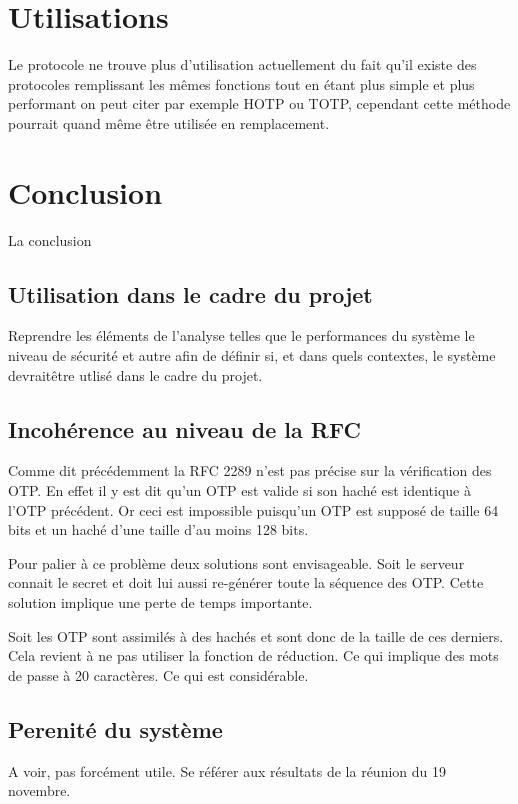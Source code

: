 \documentclass{../res/univ-projet}
\begin{document}
\section{Utilisations}
  Le protocole ne trouve plus d'utilisation actuellement du fait qu'il existe des protocoles remplissant
  les mêmes fonctions tout en étant plus simple et plus performant on peut citer par exemple HOTP ou TOTP, cependant
  cette méthode pourrait quand même être utilisée en remplacement.
  
\section{Conclusion}
  La conclusion
  \subsection{Utilisation dans le cadre du projet}
    Reprendre les éléments de l'analyse telles que le performances du système 
le 
niveau de sécurité et autre afin de définir si, et dans quels contextes, le 
système devrait\^etre utlisé dans le cadre du projet.

    \subsection{Incohérence au niveau de la RFC}
        Comme dit précédemment la RFC 2289 n'est pas précise sur la vérification
    des OTP. En effet il y est dit qu'un OTP est valide si son haché est identique
    à l'OTP précédent. Or ceci est impossible puisqu'un OTP est supposé de taille 64 bits
    et un haché d'une taille d'au moins 128 bits.
    
        Pour palier à ce problème deux solutions sont envisageable. Soit
    le serveur connait le secret et doit lui aussi re-générer toute la séquence 
    des OTP. Cette solution implique une perte de temps importante.
    
        Soit les OTP sont assimilés à des hachés et sont donc de la taille de ces derniers.
    Cela revient à ne pas utiliser la fonction de réduction. Ce qui implique des mots de passe
    à 20 caractères. Ce qui est considérable.
  
  \subsection{Perenité du système}
    A voir, pas forcément utile. Se référer aux résultats de la réunion du 19 
novembre.
    
\end{document}
